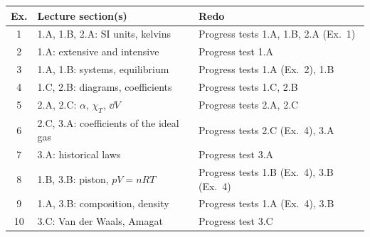 \documentclass{ibetest}
\begin{document}
\finish

\ifkey
\par\vspace{4mm}
\begin{tcolorbox}[enhanced, colback=white, colframe=black!60, boxrule=0.5pt, arc=1mm,
  title={\sffamily\bfseries Diagnosis: where did you lose marks?}, fonttitle=\small,
  coltitle=black, colbacktitle=black!10, fontupper=\small]
\begin{tabular}{@{}c l l@{}}
\textbf{Ex.} & \textbf{Lecture section(s)} & \textbf{Redo} \\ \hline
1  & 1.A, 1.B, 2.A: SI units, kelvins        & Progress tests 1.A, 1.B, 2.A (Ex.~1)\\
2  & 1.A: extensive and intensive          & Progress test 1.A\\
3  & 1.A, 1.B: systems, equilibrium          & Progress tests 1.A (Ex.~2), 1.B\\
4  & 1.C, 2.B: diagrams, coefficients        & Progress tests 1.C, 2.B\\
5  & 2.A, 2.C: $\alpha$, $\chi_T$, $\dd V$         & Progress tests 2.A, 2.C\\
6  & 2.C, 3.A: coefficients of the ideal gas & Progress tests 2.C (Ex.~4), 3.A\\
7  & 3.A: historical laws                    & Progress test 3.A\\
8  & 1.B, 3.B: piston, $pV = nRT$            & Progress tests 1.B (Ex.~4), 3.B (Ex.~4)\\
9  & 1.A, 3.B: composition, density          & Progress tests 1.A (Ex.~4), 3.B\\
10 & 3.C: Van der Waals, Amagat              & Progress test 3.C
\end{tabular}
\end{tcolorbox}
\fi
\end{document}
